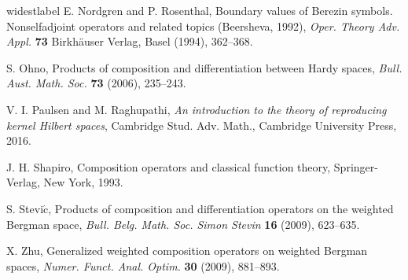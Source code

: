 \documentclass[12pt, reqno]{amsart}
\theoremstyle{definition}
\theoremstyle{remark}
\numberwithin{equation}{section}
\begin{document}
\begin{thebibliography}{widestlabel}
 {\sc E. Nordgren} and {\sc P. Rosenthal}, Boundary values of Berezin symbols. Nonselfadjoint operators and related topics (Beersheva, 1992),  \textit{Oper. Theory Adv. Appl.} {\bf 73} Birkhäuser Verlag, Basel (1994), 362--368.



 {\sc S. Ohno}, Products of composition and differentiation between Hardy spaces,  \textit{Bull. Aust. Math. Soc.} {\bf 73} (2006), 235--243.


 {\sc V. I. Paulsen} and {\sc M. Raghupathi},  \textit{An introduction to the theory of reproducing kernel Hilbert spaces}, Cambridge Stud. Adv. Math., Cambridge University Press, 2016.

 {\sc J. H. Shapiro}, Composition operators and classical function theory, Springer-Verlag, New York, 1993.

 {\sc S. Stevi$\acute{\mbox{c}}$}, Products of composition and differentiation operators on the weighted Bergman space, \textit{Bull. Belg. Math. Soc. Simon Stevin} {\bf 16} (2009), 623--635. 


 {\sc X. Zhu}, Generalized weighted composition operators on weighted Bergman spaces, \textit{Numer. Funct. Anal. Optim.} {\bf 30} (2009), 881--893. 
\end{thebibliography}
\end{document}

